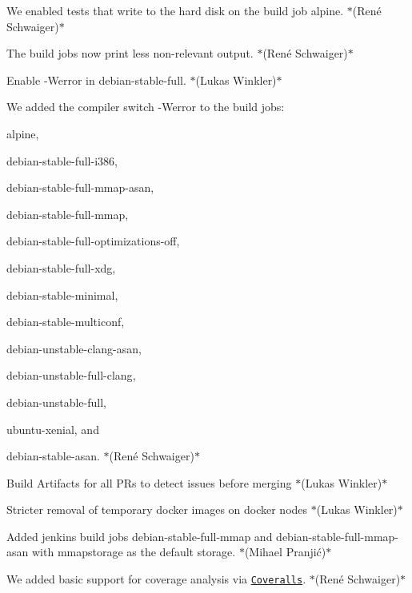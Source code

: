 \begin{DoxyItemize}
\item We enabled tests that write to the hard disk on the build job {\ttfamily alpine}. $\ast$(René Schwaiger)$\ast$
\item The build jobs now print less non-\/relevant output. $\ast$(René Schwaiger)$\ast$
\item Enable {\ttfamily -\/\+Werror} in {\ttfamily debian-\/stable-\/full}. $\ast$(Lukas Winkler)$\ast$
\item We added the compiler switch {\ttfamily -\/\+Werror} to the build jobs\+:
\begin{DoxyItemize}
\item {\ttfamily alpine},
\item {\ttfamily debian-\/stable-\/full-\/i386},
\item {\ttfamily debian-\/stable-\/full-\/mmap-\/asan},
\item {\ttfamily debian-\/stable-\/full-\/mmap},
\item {\ttfamily debian-\/stable-\/full-\/optimizations-\/off},
\item {\ttfamily debian-\/stable-\/full-\/xdg},
\item {\ttfamily debian-\/stable-\/minimal},
\item {\ttfamily debian-\/stable-\/multiconf},
\item {\ttfamily debian-\/unstable-\/clang-\/asan},
\item {\ttfamily debian-\/unstable-\/full-\/clang},
\item {\ttfamily debian-\/unstable-\/full},
\item {\ttfamily ubuntu-\/xenial}, and
\item {\ttfamily debian-\/stable-\/asan}. $\ast$(René Schwaiger)$\ast$
\end{DoxyItemize}
\item Build Artifacts for all PR\textquotesingle{}s to detect issues before merging $\ast$(Lukas Winkler)$\ast$
\item Stricter removal of temporary docker images on docker nodes $\ast$(Lukas Winkler)$\ast$
\item Added jenkins build jobs {\ttfamily debian-\/stable-\/full-\/mmap} and {\ttfamily debian-\/stable-\/full-\/mmap-\/asan} with {\ttfamily mmapstorage} as the default storage. $\ast$(Mihael Pranjić)$\ast$
\item We added basic support for coverage analysis via \href{http://coveralls.io}{\tt Coveralls}. $\ast$(René Schwaiger)$\ast$
\end{DoxyItemize}

